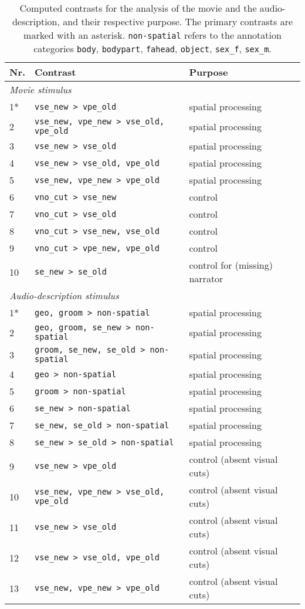 \documentclass[english]{article}
\begin{document}
\begin{table*}[tbp]
  \caption{Computed contrasts for the analysis of the movie and the audio-description,
    and their respective purpose. The primary contrasts are marked with an asterisk.
    \texttt{non-spatial} refers to the annotation categories
    \texttt{body}, \texttt{bodypart}, \texttt{fahead},
    \texttt{object}, \texttt{sex\_f}, \texttt{sex\_m}.}
\label{tab:contrasts}
\begin{tabular}{lll}
\toprule
\textbf{Nr.} &  \textbf{Contrast} & \textbf{Purpose} \\
\midrule
\multicolumn{3}{l}{\textit{Movie stimulus}}\\
1* & \texttt{vse\_new > vpe\_old} & spatial processing \tabularnewline
2 & \texttt{vse\_new, vpe\_new > vse\_old, vpe\_old} & spatial processing \tabularnewline
3 & \texttt{vse\_new > vse\_old} & spatial processing \tabularnewline
4 & \texttt{vse\_new > vse\_old, vpe\_old} & spatial processing \tabularnewline
5 & \texttt{vse\_new, vpe\_new > vpe\_old} & spatial processing \tabularnewline
6 & \texttt{vno\_cut > vse\_new} & control \tabularnewline
7 & \texttt{vno\_cut > vse\_old} & control \tabularnewline
8 & \texttt{vno\_cut > vse\_new, vse\_old} & control \tabularnewline
9 & \texttt{vno\_cut > vpe\_new, vpe\_old} & control \tabularnewline
10 & \texttt{se\_new > se\_old} & control for (missing) narrator \tabularnewline
\midrule
\multicolumn{3}{l}{\textit{Audio-description stimulus}}\\
1* & \texttt{geo, groom > non-spatial} & spatial processing \tabularnewline
2 & \texttt{geo, groom, se\_new > non-spatial} & spatial processing \tabularnewline
3 & \texttt{groom, se\_new, se\_old > non-spatial}  & spatial processing \tabularnewline
4 & \texttt{geo > non-spatial} & spatial processing \tabularnewline
5 & \texttt{groom > non-spatial} & spatial processing \tabularnewline
6 & \texttt{se\_new > non-spatial} & spatial processing \tabularnewline
7 & \texttt{se\_new, se\_old > non-spatial} & spatial processing \tabularnewline
8 & \texttt{se\_new > se\_old > non-spatial} & spatial processing \tabularnewline
9 & \texttt{vse\_new > vpe\_old} & control (absent visual cuts) \tabularnewline
10 & \texttt{vse\_new, vpe\_new > vse\_old, vpe\_old} & control (absent visual cuts) \tabularnewline
11 & \texttt{vse\_new > vse\_old} & control (absent visual cuts) \tabularnewline
12 & \texttt{vse\_new > vse\_old, vpe\_old} & control (absent visual cuts) \tabularnewline
13 & \texttt{vse\_new, vpe\_new > vpe\_old} & control (absent visual cuts) \tabularnewline
\bottomrule
\end{tabular}
\end{table*}
\end{document}
